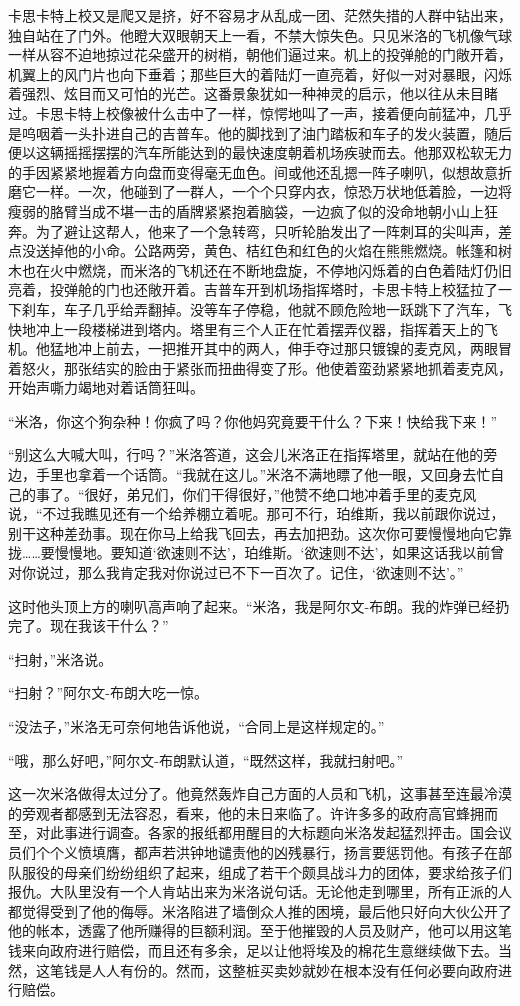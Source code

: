     卡思卡特上校又是爬又是挤，好不容易才从乱成一团、茫然失措的人群中钻出来，独自站在了门外。他瞪大双眼朝天上一看，不禁大惊失色。只见米洛的飞机像气球一样从容不迫地掠过花朵盛开的树梢，朝他们逼过来。机上的投弹舱的门敞开着，机翼上的风门片也向下垂着；那些巨大的着陆灯一直亮着，好似一对对暴眼，闪烁着强烈、炫目而又可怕的光芒。这番景象犹如一种神灵的启示，他以往从未目睹过。卡思卡特上校像被什么击中了一样，惊愕地叫了一声，接着便向前猛冲，几乎是呜咽着一头扑进自己的吉普车。他的脚找到了油门踏板和车子的发火装置，随后便以这辆摇摇摆摆的汽车所能达到的最快速度朝着机场疾驶而去。他那双松软无力的手因紧紧地握着方向盘而变得毫无血色。间或他还乱摁一阵子喇叭，似想故意折磨它一样。一次，他碰到了一群人，一个个只穿内衣，惊恐万状地低着脸，一边将瘦弱的胳臂当成不堪一击的盾牌紧紧抱着脑袋，一边疯了似的没命地朝小山上狂奔。为了避让这帮人，他来了一个急转弯，只听轮胎发出了一阵刺耳的尖叫声，差点没送掉他的小命。公路两旁，黄色、桔红色和红色的火焰在熊熊燃烧。帐篷和树木也在火中燃烧，而米洛的飞机还在不断地盘旋，不停地闪烁着的白色着陆灯仍旧亮着，投弹舱的门也还敞开着。吉普车开到机场指挥塔时，卡思卡特上校猛拉了一下刹车，车子几乎给弄翻掉。没等车子停稳，他就不顾危险地一跃跳下了汽车，飞快地冲上一段楼梯进到塔内。塔里有三个人正在忙着摆弄仪器，指挥着天上的飞机。他猛地冲上前去，一把推开其中的两人，伸手夺过那只镀镍的麦克风，两眼冒着怒火，那张结实的脸由于紧张而扭曲得变了形。他使着蛮劲紧紧地抓着麦克风，开始声嘶力竭地对着话筒狂叫。

    “米洛，你这个狗杂种！你疯了吗？你他妈究竟要干什么？下来！快给我下来！”

    “别这么大喊大叫，行吗？”米洛答道，这会儿米洛正在指挥塔里，就站在他的旁边，手里也拿着一个话筒。“我就在这儿。”米洛不满地瞟了他一眼，又回身去忙自己的事了。“很好，弟兄们，你们干得很好，”他赞不绝口地冲着手里的麦克风说，“不过我瞧见还有一个给养棚立着呢。那可不行，珀维斯，我以前跟你说过，别干这种差劲事。现在你马上给我飞回去，再去加把劲。这次你可要慢慢地向它靠拢……要慢慢地。要知道‘欲速则不达’，珀维斯。‘欲速则不达’，如果这话我以前曾对你说过，那么我肯定我对你说过已不下一百次了。记住，‘欲速则不达’。”

    这时他头顶上方的喇叭高声响了起来。“米洛，我是阿尔文-布朗。我的炸弹已经扔完了。现在我该干什么？”

    “扫射，”米洛说。

    “扫射？”阿尔文-布朗大吃一惊。

    “没法子，”米洛无可奈何地告诉他说，“合同上是这样规定的。”

    “哦，那么好吧，”阿尔文-布朗默认道，“既然这样，我就扫射吧。”

    这一次米洛做得太过分了。他竟然轰炸自己方面的人员和飞机，这事甚至连最冷漠的旁观者都感到无法容忍，看来，他的未日来临了。许许多多的政府高官蜂拥而至，对此事进行调查。各家的报纸都用醒目的大标题向米洛发起猛烈抨击。国会议员们个个义愤填膺，都声若洪钟地谴责他的凶残暴行，扬言要惩罚他。有孩子在部队服役的母亲们纷纷组织了起来，组成了若干个颇具战斗力的团体，要求给孩子们报仇。大队里没有一个人肯站出来为米洛说句话。无论他走到哪里，所有正派的人都觉得受到了他的侮辱。米洛陷进了墙倒众人推的困境，最后他只好向大伙公开了他的帐本，透露了他所赚得的巨额利润。至于他摧毁的人员及财产，他可以用这笔钱来向政府进行赔偿，而且还有多余，足以让他将埃及的棉花生意继续做下去。当然，这笔钱是人人有份的。然而，这整桩买卖妙就妙在根本没有任何必要向政府进行赔偿。

